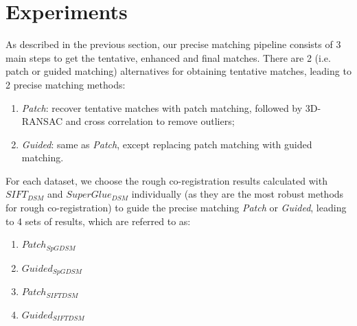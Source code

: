 \section{Experiments}
As described in the previous section, our precise matching pipeline consists of 3 main steps to get the tentative, enhanced and final matches. There are 2 (i.e. patch or guided matching) alternatives for obtaining tentative matches, leading to 2 precise matching methods:\\
\begin{enumerate}
	\item \textit{Patch}: recover tentative matches with patch matching, followed by 3D-RANSAC and cross correlation to remove outliers;
	\item \textit{Guided}: same as \textit{Patch}, except replacing patch matching with guided matching.
\end{enumerate}
For each dataset, we choose the rough co-registration results calculated with $SIFT_{DSM}$ and $SuperGlue_{DSM}$ individually (as they are the most robust methods for rough co-registration) to guide the precise matching \textit{Patch} or \textit{Guided}, leading to 4 sets of results, which are referred to as:\\
\begin{enumerate}
	\item $Patch_{SpGDSM}$
	\item $Guided_{SpGDSM}$
	\item $Patch_{SIFTDSM}$
	\item $Guided_{SIFTDSM}$
\end{enumerate}

